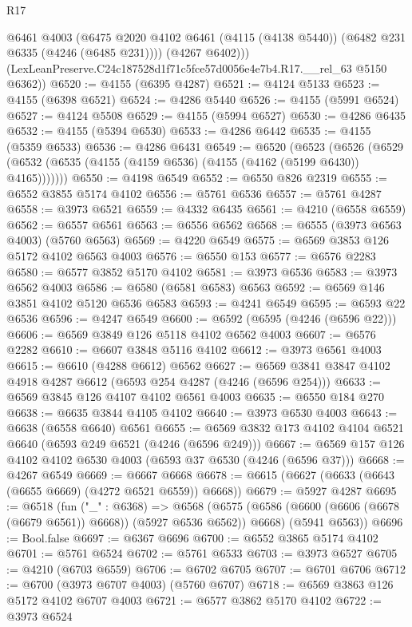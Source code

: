 \begin{lexlean}{R17}
\begin{coremodule}
          @6461
          @4003
          (@6475 @2020 @4102 @6461 (@4115 (@4138 @5440)) (@6482 @231 @6335 (@4246 (@6485 @231))))
          (@4267 @6402)))
      (LexLeanPreserve.C24c187528d1f71c5fce57d0056e4e7b4.R17.__rel_63 @5150 @6362))
@6520 := @4155 (@6395 @4287)
@6521 := @4124 @5133
@6523 := @4155 (@6398 @6521)
@6524 := @4286 @5440
@6526 := @4155 (@5991 @6524)
@6527 := @4124 @5508
@6529 := @4155 (@5994 @6527)
@6530 := @4286 @6435
@6532 := @4155 (@5394 @6530)
@6533 := @4286 @6442
@6535 := @4155 (@5359 @6533)
@6536 := @4286 @6431
@6549 := @6520
    (@6523
      (@6526 (@6529 (@6532 (@6535 (@4155 (@4159 @6536) (@4155 (@4162 (@5199 @6430)) @4165)))))))
@6550 := @4198 @6549
@6552 := @6550 @826 @2319
@6555 := @6552 @3855 @5174 @4102
@6556 := @5761 @6536
@6557 := @5761 @4287
@6558 := @3973 @6521
@6559 := @4332 @6435
@6561 := @4210 (@6558 @6559)
@6562 := @6557 @6561
@6563 := @6556 @6562
@6568 := @6555 (@3973 @6563 @4003) (@5760 @6563)
@6569 := @4220 @6549
@6575 := @6569 @3853 @126 @5172 @4102 @6563 @4003
@6576 := @6550 @153
@6577 := @6576 @2283
@6580 := @6577 @3852 @5170 @4102
@6581 := @3973 @6536
@6583 := @3973 @6562 @4003
@6586 := @6580 (@6581 @6583) @6563
@6592 := @6569 @146 @3851 @4102 @5120 @6536 @6583
@6593 := @4241 @6549
@6595 := @6593 @22 @6536
@6596 := @4247 @6549
@6600 := @6592 (@6595 (@4246 (@6596 @22)))
@6606 := @6569 @3849 @126 @5118 @4102 @6562 @4003
@6607 := @6576 @2282
@6610 := @6607 @3848 @5116 @4102
@6612 := @3973 @6561 @4003
@6615 := @6610 (@4288 @6612) @6562
@6627 := @6569 @3841 @3847 @4102 @4918 @4287 @6612 (@6593 @254 @4287 (@4246 (@6596 @254)))
@6633 := @6569 @3845 @126 @4107 @4102 @6561 @4003
@6635 := @6550 @184 @270
@6638 := @6635 @3844 @4105 @4102
@6640 := @3973 @6530 @4003
@6643 := @6638 (@6558 @6640) @6561
@6655 := @6569 @3832 @173 @4102 @4104 @6521 @6640 (@6593 @249 @6521 (@4246 (@6596 @249)))
@6667 := @6569 @157 @126 @4102 @4102 @6530 @4003 (@6593 @37 @6530 (@4246 (@6596 @37)))
@6668 := @4267 @6549
@6669 := @6667 @6668
@6678 := @6615 (@6627 (@6633 (@6643 (@6655 @6669) (@4272 @6521 @6559)) @6668))
@6679 := @5927 @4287
@6695 := @6518
    (fun ("_" : @6368) =>
    @6568
      (@6575 (@6586 (@6600 (@6606 (@6678 (@6679 @6561)) @6668)) (@5927 @6536 @6562)) @6668)
      (@5941 @6563))
@6696 := Bool.false
@6697 := @6367 @6696
@6700 := @6552 @3865 @5174 @4102
@6701 := @5761 @6524
@6702 := @5761 @6533
@6703 := @3973 @6527
@6705 := @4210 (@6703 @6559)
@6706 := @6702 @6705
@6707 := @6701 @6706
@6712 := @6700 (@3973 @6707 @4003) (@5760 @6707)
@6718 := @6569 @3863 @126 @5172 @4102 @6707 @4003
@6721 := @6577 @3862 @5170 @4102
@6722 := @3973 @6524

\end{coremodule}
\end{lexlean}
